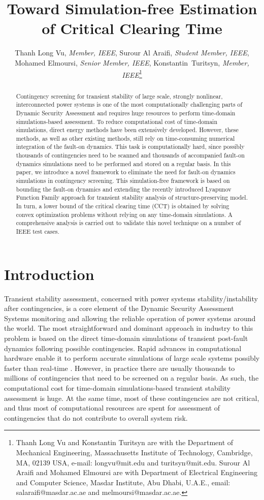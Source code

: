 \documentclass[final]{IEEEtran}
\title{Toward Simulation-free Estimation of Critical Clearing Time}
\author{Thanh Long Vu, \textit{Member, IEEE}, Surour Al Araifi, \textit{Student Member, IEEE}, Mohamed Elmoursi, \textit{Senior Member, IEEE}, Konstantin~Turitsyn, \textit{Member, IEEE}\thanks{Thanh Long Vu and Konstantin Turitsyn are with the Department of Mechanical Engineering, Massachusetts Institute of Technology, Cambridge, MA, 02139 USA, e-mail: longvu@mit.edu and turitsyn@mit.edu.
Surour Al Araifi and Mohamed Elmoursi  are with Department of
Electrical Engineering and Computer Science, Masdar Institute, Abu
Dhabi, U.A.E., email: salaraifi@masdar.ac.ae and
melmoursi@masdar.ac.ae.


}}
\begin{document}
\maketitle
\begin{abstract}
Contingency screening for transient stability of large scale,
strongly nonlinear, interconnected  power systems is one of the
most computationally challenging parts of Dynamic Security
Assessment and requires huge resources to perform time-domain
simulations-based assessment. To reduce computational cost of
time-domain simulations, direct energy methods have been
extensively developed. However, these methods, as well as other
existing methods, still rely on time-consuming numerical
integration of the fault-on dynamics. This task is computationally
hard, since possibly thousands of contingencies need to be scanned
and thousands of accompanied fault-on dynamics simulations need to
be performed and stored on a regular basis. In this paper, we
introduce a novel framework to eliminate the need for fault-on
dynamics simulations in contingency screening. This
simulation-free framework is based on bounding the fault-on
dynamics and extending the recently introduced Lyapunov Function
Family approach for transient stability analysis of
structure-preserving model. In turn, a lower bound of the critical
clearing time (CCT) is obtained by solving convex optimization problems
without relying on any time-domain simulations. A comprehensive
analysis is carried out to validate this novel technique on a
number of IEEE test cases.
\end{abstract}




\maketitle

\section{Introduction}




Transient stability assessment, concerned with power systems
stability/instability after contingencies, is a core element of
the Dynamic Security Assessment Systems monitoring and allowing
the reliable operation of power systems around the world. The most
straightforward and dominant approach in industry to this problem
is based on the direct time-domain simulations of transient
post-fault dynamics following possible contingencies. Rapid
advances in computational hardware enable it to perform accurate
simulations of large scale systems possibly faster than real-time
\cite{Huang:2012il,Nagel:2013kf}. However, in practice there are
usually thousands to millions of contingencies that need to be
screened on a regular basis. As such, the computational cost for
time-domain simulations-based transient stability assessment is
huge. At the same time, most of these contingencies are not
critical, and thus most of computational resources are spent for
assessment of contingencies that do not contribute to overall
system risk.
\end{document}
